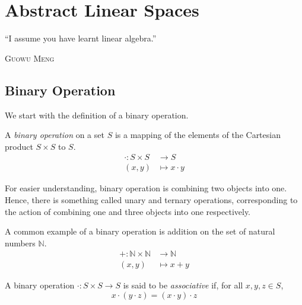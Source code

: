 \documentclass[
	11pt, %
	fleqn, %
	a4paper, %
]{LegrandOrangeBook}
\let\originalepigraph\epigraph
\renewcommand\epigraph[2]{\originalepigraph{#1}{\textsc{#2}}}
\begin{document}
\chapterspaceabove{8cm} %
\chapterspacebelow{8cm} %

\chapter{Abstract Linear Spaces}

\epigraph{``I assume you have learnt linear algebra.''}{Guowu Meng}

\section{Binary Operation}

We start with the definition of a binary operation.

\begin{definition}
    A \emph{binary operation} on a set $S$ is a mapping of the elements of the Cartesian product $S \times S$ to $S$.
    \[ \begin{split}
            \cdot : S \times S & \to S \\ (x,y) &\mapsto x \cdot y
        \end{split}\]
\end{definition}

For easier understanding, binary operation is combining two objects into one. Hence, there is something called unary and ternary operations, corresponding to the action of combining one and three objects into one respectively.

\begin{example}
    A common example of a binary operation is addition on the set of natural numbers $\mathbb{N}$.
    \begin{equation}
        \begin{split}
            + : \mathbb{N} \times \mathbb{N} & \to \mathbb{N} \\ (x,y) &\mapsto x+y
        \end{split}
    \end{equation}
\end{example}

\begin{definition}[Associative]
    A binary operation $\cdot: S \times S \to S$ is said to be \emph{associative} if, for all $x,y,z \in S$, 
    \[ x \cdot (y \cdot z) = (x \cdot y) \cdot z \]
\end{definition}
\end{document}
